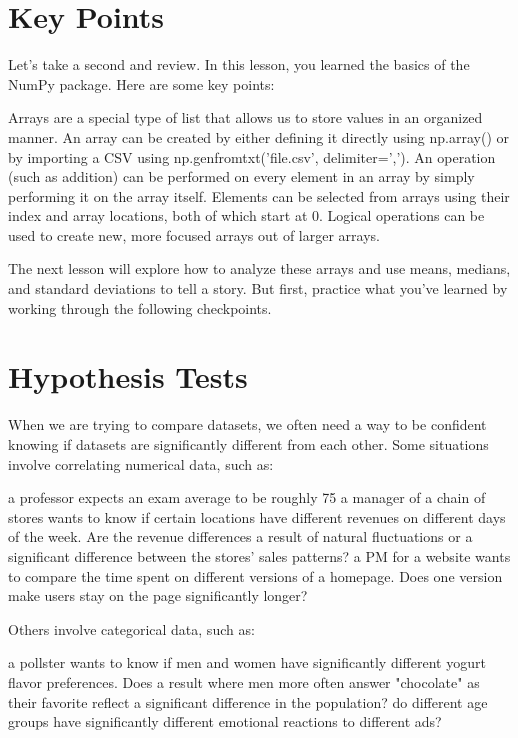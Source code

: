 \documentclass{journal}
\begin{document}
\section{Key Points}
Let's take a second and review. In this lesson, you learned the basics of the NumPy package. Here are some key points:

    Arrays are a special type of list that allows us to store values in an organized manner.
    An array can be created by either defining it directly using np.array() or by importing a CSV using np.genfromtxt('file.csv', delimiter=',').
    An operation (such as addition) can be performed on every element in an array by simply performing it on the array itself.
    Elements can be selected from arrays using their index and array locations, both of which start at 0.
    Logical operations can be used to create new, more focused arrays out of larger arrays.

The next lesson will explore how to analyze these arrays and use means, medians, and standard deviations to tell a story. But first, practice what you've learned by working through the following checkpoints.


\section{Hypothesis Tests}
When we are trying to compare datasets, we often need a way to be confident knowing if datasets are significantly different from each other.
Some situations involve correlating numerical data, such as:

    a professor expects an exam average to be roughly 75%
    a manager of a chain of stores wants to know if certain locations have different revenues on different days of the week. Are the revenue differences a result of natural fluctuations or a significant difference between the stores' sales patterns?
    a PM for a website wants to compare the time spent on different versions of a homepage. Does one version make users stay on the page significantly longer?

Others involve categorical data, such as:

    a pollster wants to know if men and women have significantly different yogurt flavor preferences. Does a result where men more often answer "chocolate" as their favorite reflect a significant difference in the population?
    do different age groups have significantly different emotional reactions to different ads?
\end{document}
